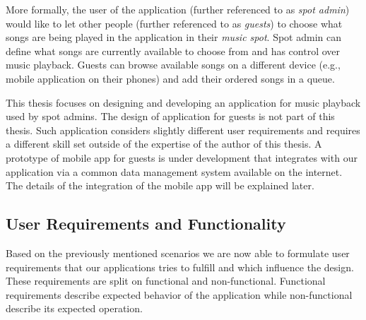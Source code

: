 \par
More formally, the user of the application (further referenced to as \textit{spot admin}) would like to let other people (further referenced to as \textit{guests}) to choose what songs are being played in the application in their \textit{music spot}. Spot admin can define what songs are currently available to choose from and has control over music playback. Guests can browse available songs on a different device (e.g., mobile application on their phones) and add their ordered songs in a queue.
\par
This thesis focuses on designing and developing an application for music playback used by spot admins. The design of application for guests is not part of this thesis. Such application considers slightly different user requirements and requires a different skill set outside of the expertise of the author of this thesis. A prototype of mobile app for guests is under development that integrates with our application via a common data management system available on the internet. The details of the integration of the mobile app will be explained later.

\subsection{User Requirements and Functionality}

Based on the previously mentioned scenarios we are now able to formulate user requirements that our applications tries to fulfill and which influence the design. These requirements are split on functional and non-functional. Functional requirements describe expected behavior of the application while non-functional describe its expected operation.

